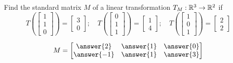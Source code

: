\documentclass{ximera}
\author{}
\begin{document}
\begin{exercise}
Find the standard matrix $M$ of a linear transformation $T_M:\mathbb{R}^3\rightarrow \mathbb{R}^2$ if
$$T\left(\begin{bmatrix}1\\1\\0\end{bmatrix}\right)=\begin{bmatrix}3\\0\end{bmatrix};\quad T\left(\begin{bmatrix}0\\1\\1\end{bmatrix}\right)=\begin{bmatrix}1\\4\end{bmatrix};\quad T\left(\begin{bmatrix}1\\0\\1\end{bmatrix}\right)=\begin{bmatrix}2\\2\end{bmatrix}$$

$$M=\begin{bmatrix}\answer{2} & \answer{1} & \answer{0}\\\answer{-1} &\answer{1} & \answer{3}\end{bmatrix}$$

 \end{exercise}
 
\end{document}
